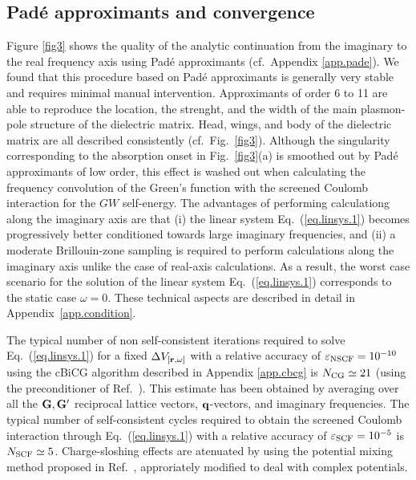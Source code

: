 \documentclass[twocolumn,prb,showpacs,superscriptaddress]{revtex4}
\def\w{\omega}
\def\q{{\bf q}}
\def\G{{\bf G}}
\def\Gp{{\bf G^\prime}}
\def\r{{\bf r}}
\begin{document}
\subsection{Pad\'e approximants and convergence}\label{sec.conv}

Figure \ref{fig3} shows the quality of the analytic continuation from the imaginary to
the real frequency axis using Pad\'e approximants (cf.\ Appendix \ref{app.pade}). We found that this procedure based on 
Pad\'e approximants is generally very stable and requires minimal manual intervention.
Approximants of order 6 to 11 are able to reproduce the location, the strenght, and the width of
the main plasmon-pole structure of the dielectric matrix. Head, wings, and body of the
dielectric matrix are all described consistently (cf.\ Fig.\ \ref{fig3}). Although the singularity
corresponding to the absorption onset in Fig.\ \ref{fig3}(a) is smoothed out by 
Pad\'e approximants of low order, this effect
is washed out when calculating the frequency convolution of the Green's function with
the screened Coulomb interaction for the $GW$ self-energy.
The advantages of performing calculationg along the imaginary axis are that (i) the 
linear system Eq.\ (\ref{eq.linsys.1}) becomes progressively better conditioned
towards large imaginary frequencies, and (ii) a moderate Brillouin-zone sampling is
required to perform calculations along the imaginary axis unlike the case of real-axis
calculations. As a result, the worst case scenario for the solution
of the linear system Eq.\ (\ref{eq.linsys.1}) corresponds to the static case $\w=0$.
These technical aspects are described in detail in Appendix~\ref{app.condition}.

The typical number of non self-consistent iterations required to solve Eq.\ (\ref{eq.linsys.1})
for a fixed $\Delta V_{[\r,\w]}$ with a relative accuracy of $\varepsilon_{\rm NSCF}=10^{-10}$
using the cBiCG algorithm described in Appendix \ref{app.cbcg} is $N_{\rm CG}\simeq 21$
(using the preconditioner of Ref.\ ). This estimate has been obtained by averaging
over all the $\G,\Gp$ reciprocal lattice vectors, $\q$-vectors, and imaginary frequencies.
The typical number of self-consistent cycles required to obtain the screened Coulomb
interaction through Eq.\ (\ref{eq.linsys.1}) with a relative accuracy of $\varepsilon_{\rm SCF}=10^{-5}$ 
is $N_{\rm SCF}\simeq 5$.
%
%
Charge-sloshing effects are atenuated by using the potential mixing method proposed in
 Ref.\ , approriately modified to deal with complex potentials. 
\end{document}
